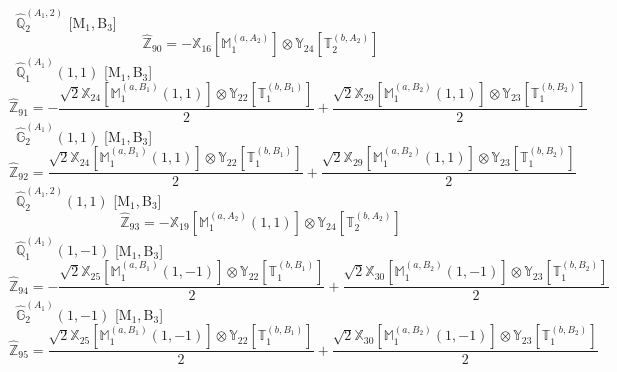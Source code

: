 \documentclass[fleqn,10pt,landscape]{article}
\begin{document}
\begin{itemize}
\begin{dmath*}
\end{dmath*}
\vspace{4mm}
\noindent {} $\,\,\,\hat{\mathbb{Q}}_{2}^{(A_{1},2)}$ [M$_{1}$,\,B$_{3}$]
\begin{dmath*}
\hat{\mathbb{Z}}_{90}=- \mathbb{X}_{16}[\mathbb{M}_{1}^{(a,A_{2})}] \otimes\mathbb{Y}_{24}[\mathbb{T}_{2}^{(b,A_{2})}]
\end{dmath*}
\vspace{4mm}
\noindent {} $\,\,\,\hat{\mathbb{Q}}_{1}^{(A_{1})}(1,1)$ [M$_{1}$,\,B$_{3}$]
\begin{dmath*}
\hat{\mathbb{Z}}_{91}=- \frac{\sqrt{2} \mathbb{X}_{24}[\mathbb{M}_{1}^{(a,B_{1})}(1,1)] \otimes\mathbb{Y}_{22}[\mathbb{T}_{1}^{(b,B_{1})}]}{2} + \frac{\sqrt{2} \mathbb{X}_{29}[\mathbb{M}_{1}^{(a,B_{2})}(1,1)] \otimes\mathbb{Y}_{23}[\mathbb{T}_{1}^{(b,B_{2})}]}{2}
\end{dmath*}
\vspace{4mm}
\noindent {} $\,\,\,\hat{\mathbb{G}}_{2}^{(A_{1})}(1,1)$ [M$_{1}$,\,B$_{3}$]
\begin{dmath*}
\hat{\mathbb{Z}}_{92}=\frac{\sqrt{2} \mathbb{X}_{24}[\mathbb{M}_{1}^{(a,B_{1})}(1,1)] \otimes\mathbb{Y}_{22}[\mathbb{T}_{1}^{(b,B_{1})}]}{2} + \frac{\sqrt{2} \mathbb{X}_{29}[\mathbb{M}_{1}^{(a,B_{2})}(1,1)] \otimes\mathbb{Y}_{23}[\mathbb{T}_{1}^{(b,B_{2})}]}{2}
\end{dmath*}
\vspace{4mm}
\noindent {} $\,\,\,\hat{\mathbb{Q}}_{2}^{(A_{1},2)}(1,1)$ [M$_{1}$,\,B$_{3}$]
\begin{dmath*}
\hat{\mathbb{Z}}_{93}=- \mathbb{X}_{19}[\mathbb{M}_{1}^{(a,A_{2})}(1,1)] \otimes\mathbb{Y}_{24}[\mathbb{T}_{2}^{(b,A_{2})}]
\end{dmath*}
\vspace{4mm}
\noindent {} $\,\,\,\hat{\mathbb{Q}}_{1}^{(A_{1})}(1,-1)$ [M$_{1}$,\,B$_{3}$]
\begin{dmath*}
\hat{\mathbb{Z}}_{94}=- \frac{\sqrt{2} \mathbb{X}_{25}[\mathbb{M}_{1}^{(a,B_{1})}(1,-1)] \otimes\mathbb{Y}_{22}[\mathbb{T}_{1}^{(b,B_{1})}]}{2} + \frac{\sqrt{2} \mathbb{X}_{30}[\mathbb{M}_{1}^{(a,B_{2})}(1,-1)] \otimes\mathbb{Y}_{23}[\mathbb{T}_{1}^{(b,B_{2})}]}{2}
\end{dmath*}
\vspace{4mm}
\noindent {} $\,\,\,\hat{\mathbb{G}}_{2}^{(A_{1})}(1,-1)$ [M$_{1}$,\,B$_{3}$]
\begin{dmath*}
\hat{\mathbb{Z}}_{95}=\frac{\sqrt{2} \mathbb{X}_{25}[\mathbb{M}_{1}^{(a,B_{1})}(1,-1)] \otimes\mathbb{Y}_{22}[\mathbb{T}_{1}^{(b,B_{1})}]}{2} + \frac{\sqrt{2} \mathbb{X}_{30}[\mathbb{M}_{1}^{(a,B_{2})}(1,-1)] \otimes\mathbb{Y}_{23}[\mathbb{T}_{1}^{(b,B_{2})}]}{2}

\end{dmath*}
\end{itemize}
\end{document}
